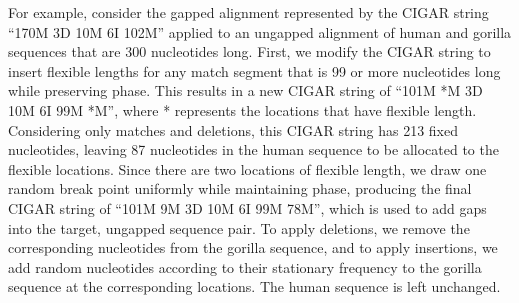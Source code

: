 \documentclass[12pt,letterpaper]{article}
\begin{document}
For example, consider the gapped alignment represented by the CIGAR string
%
``170M 3D 10M 6I 102M'' %
%
applied to an ungapped alignment of human and gorilla sequences that are 300 nucleotides long. First, we modify the CIGAR string to insert flexible lengths for any match segment that is 99 or more nucleotides long while preserving phase. This results in a new CIGAR string of
%
``101M *M 3D 10M 6I 99M *M'',
%
where * represents the locations that have flexible length. Considering only matches and deletions, this CIGAR string has 213 fixed nucleotides, leaving 87 nucleotides in the human sequence to be allocated to the flexible locations. Since there are two locations of flexible length, we draw one random break point uniformly while maintaining phase, producing the final CIGAR string of
%
``101M 9M 3D 10M 6I 99M 78M'',
%
which is used to add gaps into the target, ungapped sequence pair.
To apply deletions, we remove the corresponding nucleotides from the gorilla sequence, and to apply insertions, we add random nucleotides according to their stationary frequency to the gorilla sequence at the corresponding locations. The human sequence is left unchanged.



\end{document}
